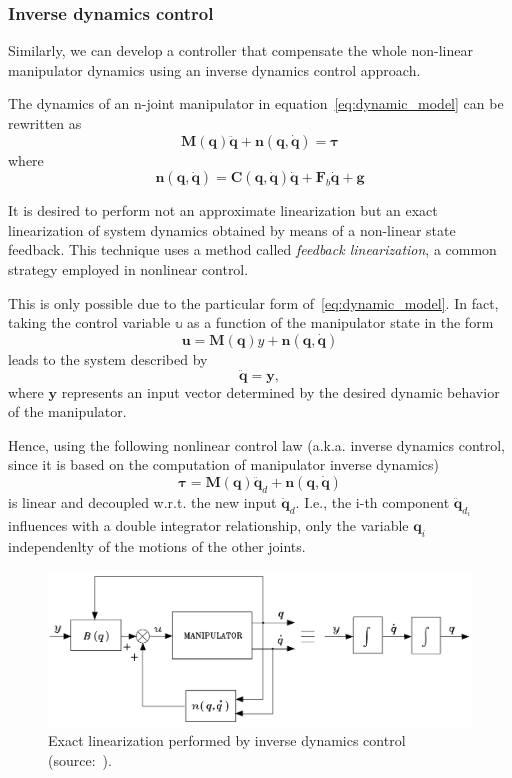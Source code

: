 \documentclass[10pt, aspectratio=169]{beamer}
\theoremstyle{remark}
\theoremstyle{definition}
\begin{document}
\begin{frame}[allowframebreaks]
\frametitle{Inverse dynamics control}
	Similarly, we can develop a controller that compensate the whole non-linear manipulator dynamics using an inverse dynamics control approach. 

    The dynamics of an n-joint manipulator in equation~\ref{eq:dynamic_model} can be rewritten as
    \begin{equation}
        \mathbf{M}(\mathbf{q}) \ddot{\mathbf{q}} + \mathbf{n}(\mathbf{q}, \dot{\mathbf{q}}) = \boldsymbol{\tau}
        \label{eq:inverse_dynamics_control}
    \end{equation}
    where
    $$ \mathbf{n}(\mathbf{q}, \dot{\mathbf{q}}) = \mathbf{C} (\mathbf{q}, \dot{\mathbf{q}}) \dot{\mathbf{q}} + \mathbf{F}_b \dot{\mathbf{q}} + \mathbf{g}
    $$

    It is desired to perform not an approximate linearization but an exact linearization of system dynamics obtained by means of a non-linear state feedback. This technique uses a method called \textit{feedback linearization}, a common strategy employed in nonlinear control.

    \framebreak
    
    This is only possible due to the particular form of~\ref{eq:dynamic_model}. In fact, taking the control variable $\mathbb{u}$ as a function of the manipulator state in the form
    $$
    \boldsymbol{u} = \mathbf{M}(\mathbf{q}) y + \mathbf{n}(\mathbf{q}, \dot{\mathbf{q}})
    $$
    leads to the system described by
    $$
    \ddot{\mathbf{q}} = \mathbf{y},
    $$
    where $\mathbf{y}$ represents an input vector determined by the desired dynamic behavior of the manipulator. 

    Hence, using the following nonlinear control law (a.k.a. inverse dynamics control, since it is based on the computation of manipulator inverse dynamics) 
    $$
    \boldsymbol{\tau} = \mathbf{M}(\mathbf{q}) \ddot{\mathbf{q}}_d   + \mathbf{n}(\mathbf{q}, \dot{\mathbf{q}})
    $$
    is linear and decoupled w.r.t. the new input $\ddot{\mathbf{q}}_d$. I.e., the i-th component $\ddot{\mathbf{q}}_{d_i}$ influences with a double integrator relationship, only the variable $\mathbf{q}_i$ independenlty of the motions of the other joints.

    \framebreak

    \begin{figure}
        \centering
        \includegraphics[width=0.75\linewidth]{images/exact_linearization.png}
        \caption{Exact linearization performed by inverse dynamics control (source:~\cite{sciavicco2010robotics}).}
        \label{fig:exact_linearization}
    \end{figure}


\end{frame}
\end{document}
